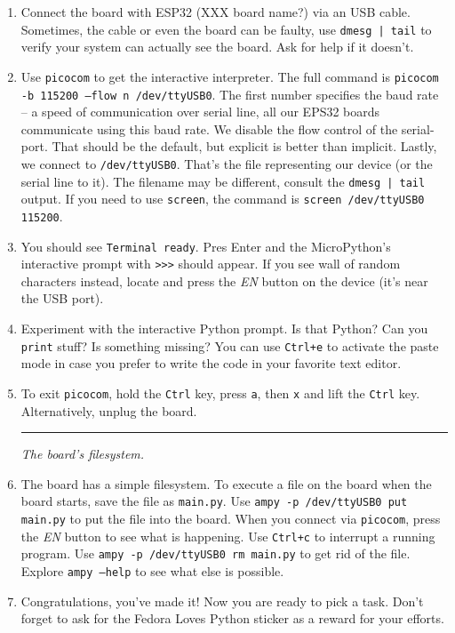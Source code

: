 \documentclass[a4paper,10pt]{article}
\newcommand\startsection[1]{
     \vspace{0.2ex}
    \hrule
    {\fontspec{Oxygen} \tiny
     \vspace{-1ex}
     \emph{#1}
     \vspace{-1.5em}
    }
}
\begin{document}
\begin{enumerate}[resume]

\item Connect the board with ESP32 (XXX board name?) via an USB cable.
      Sometimes, the cable or even the board can be faulty,
      use \texttt{dmesg | tail} to verify your system can actually see the board.
      Ask for help if it doesn't.

\item Use \texttt{picocom} to get the interactive interpreter.
      The full command is \texttt{picocom -b 115200 --flow n /dev/ttyUSB0}.
      The first number specifies the baud rate -- a speed of communication over serial line,
      all our EPS32 boards communicate using this baud rate.
      We disable the flow control of the serial-port.
      That should be the default,
      but explicit is better than implicit.
      Lastly, we connect to \texttt{/dev/ttyUSB0}.
      That's the file representing our device (or the serial line to it).
      The filename may be different, consult the \texttt{dmesg | tail} output.
      If you need to use \texttt{screen},
      the command is \texttt{screen /dev/ttyUSB0 115200}.

\item You should see \texttt{Terminal ready}.
      Pres Enter and the MicroPython's interactive prompt with \texttt{>>>} should appear.
      If you see wall of random characters instead,
      locate and press the \emph{EN} button on the device
      (it's near the USB port).

\item Experiment with the interactive Python prompt. Is that Python?
      Can you \texttt{print} stuff? Is something missing?
      You can use \texttt{Ctrl+e} to activate the paste mode
      in case you prefer to write the code in your favorite text editor.

\item To exit \texttt{picocom}, hold the \texttt{Ctrl} key, press \texttt{a},
      then \texttt{x} and lift the \texttt{Ctrl} key.
      Alternatively, unplug the board.

\startsection{The board's filesystem.}

\item The board has a simple filesystem.
      To execute a file on the board when the board starts,
      save the file as \texttt{main.py}.
      Use \texttt{ampy -p /dev/ttyUSB0 put main.py} to put the file into the board.
      When you connect via \texttt{picocom}, press the \emph{EN} button to see
      what is happening. Use \texttt{Ctrl+c} to interrupt a running program.
      Use \texttt{ampy -p /dev/ttyUSB0 rm main.py} to get rid of the file.
      Explore \texttt{ampy --help} to see what else is possible.

\item Congratulations, you've made it! Now you are ready to pick a task.
    Don't forget to ask for the Fedora Loves Python sticker as a reward for your efforts.

\end{enumerate}
\end{document}

